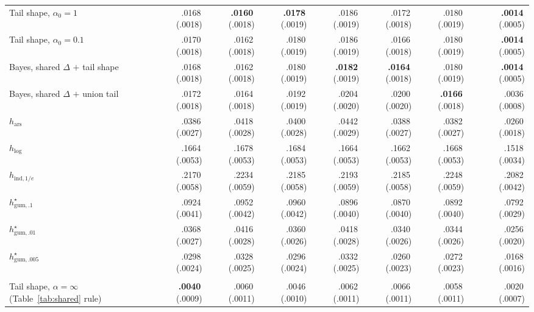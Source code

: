 \documentclass[11pt]{article}
\newcommand{\mcse}[2]{\mbox{#1\,{\fontsize{7}{8}\selectfont(#2)}}}
\newcommand{\bestmcse}[2]{\mbox{\textbf{#1}\,{\fontsize{7}{8}\selectfont(#2)}}}
\begin{document}
\begin{table}[p]
\begin{tabular}{@{}lrrrrrrcr@{}}
Tail shape, $\alpha_0=1$ & \mcse{.0168}{.0018} & \bestmcse{.0160}{.0018} & \bestmcse{.0178}{.0019} & \mcse{.0186}{.0019} & \mcse{.0172}{.0018} & \mcse{.0180}{.0019} & & \bestmcse{.0014}{.0005} \\
Tail shape, $\alpha_0=0.1$ & \mcse{.0170}{.0018} & \mcse{.0162}{.0018} & \mcse{.0180}{.0019} & \mcse{.0186}{.0019} & \mcse{.0166}{.0018} & \mcse{.0180}{.0019} & & \bestmcse{.0014}{.0005} \\
Bayes, shared $\Delta$ $+$ tail shape & \mcse{.0168}{.0018} & \mcse{.0162}{.0018} & \mcse{.0180}{.0019} & \bestmcse{.0182}{.0019} & \bestmcse{.0164}{.0018} & \mcse{.0180}{.0019} & & \bestmcse{.0014}{.0005} \\
Bayes, shared $\Delta$ $+$ union tail & \mcse{.0172}{.0018} & \mcse{.0164}{.0018} & \mcse{.0192}{.0019} & \mcse{.0204}{.0020} & \mcse{.0200}{.0020} & \bestmcse{.0166}{.0018} & & \mcse{.0036}{.0008} \\
\addlinespace[1pt]
$h_{\mathrm{ars}}$ & \mcse{.0386}{.0027} & \mcse{.0418}{.0028} & \mcse{.0400}{.0028} & \mcse{.0442}{.0029} & \mcse{.0388}{.0027} & \mcse{.0382}{.0027} & & \mcse{.0260}{.0018} \\
$h_{\log}$ & \mcse{.1664}{.0053} & \mcse{.1678}{.0053} & \mcse{.1684}{.0053} & \mcse{.1664}{.0053} & \mcse{.1662}{.0053} & \mcse{.1668}{.0053} & & \mcse{.1518}{.0034} \\
$h_{\mathrm{ind},1/e}$ & \mcse{.2170}{.0058} & \mcse{.2234}{.0059} & \mcse{.2185}{.0058} & \mcse{.2193}{.0059} & \mcse{.2185}{.0058} & \mcse{.2248}{.0059} & & \mcse{.2082}{.0042} \\
$h^\star_{\mathrm{gum},.1}$ & \mcse{.0924}{.0041} & \mcse{.0952}{.0042} & \mcse{.0960}{.0042} & \mcse{.0896}{.0040} & \mcse{.0870}{.0040} & \mcse{.0892}{.0040} & & \mcse{.0792}{.0029} \\
$h^\star_{\mathrm{gum},.01}$ & \mcse{.0368}{.0027} & \mcse{.0416}{.0028} & \mcse{.0360}{.0026} & \mcse{.0418}{.0028} & \mcse{.0340}{.0026} & \mcse{.0344}{.0026} & & \mcse{.0256}{.0020} \\
$h^\star_{\mathrm{gum},.005}$ & \mcse{.0298}{.0024} & \mcse{.0328}{.0025} & \mcse{.0296}{.0024} & \mcse{.0332}{.0025} & \mcse{.0260}{.0023} & \mcse{.0272}{.0023} & & \mcse{.0168}{.0016} \\
\addlinespace[1pt]
\multicolumn{9}{@{}l}{\textit{Horizon $n=300$}}\\
Tail shape, $\alpha=\infty$ (Table~\ref{tab:shared} rule) & \bestmcse{.0040}{.0009} & \mcse{.0060}{.0011} & \mcse{.0046}{.0010} & \mcse{.0062}{.0011} & \mcse{.0066}{.0011} & \mcse{.0058}{.0011} & & \mcse{.0020}{.0007} \\

\end{tabular}
\end{table}
\end{document}
